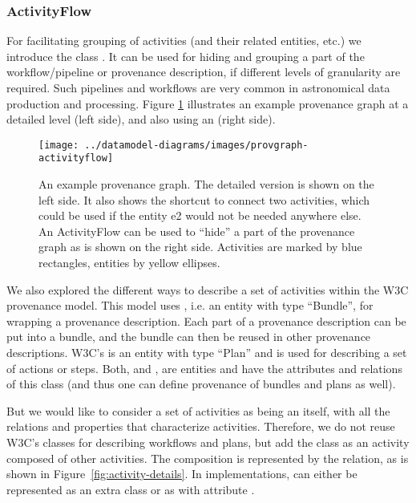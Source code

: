 \subsubsection{ActivityFlow}\label{sec:activityflow}
For facilitating grouping of activities (and their related entities, etc.) we
introduce the class . It can be used for hiding and grouping
a part of the workflow/pipeline  or provenance  description, if different levels
of granularity are required. Such pipelines and workflows are very common in
astronomical data production and processing. Figure
\ref{fig:provgraph-activityflow} illustrates an example provenance graph at a
detailed level (left side), and also using an  (right
side).


\begin{figure}[h]
\centering
\texttt{[image: ../datamodel-diagrams/images/provgraph-activityflow]}
\caption[Example provenance graph with ]{An example provenance graph. The detailed version is shown on the left side. It also shows
the shortcut  to connect two activities, which could be used if the entity e2 
would not be needed anywhere else.
An ActivityFlow can be used to ``hide'' a part of the provenance graph as is shown on the right side.
Activities are marked by blue rectangles, entities by yellow ellipses.}
\label{fig:provgraph-activityflow}
\end{figure}

We also explored the different ways to describe a set of activities within the
W3C provenance model. This model uses , i.e. an entity with type
``Bundle'',  for wrapping a provenance description. Each part of a provenance
description can be  put into a bundle, and the bundle can then be reused in
other provenance descriptions.  W3C's  is an entity with type
``Plan'' and is used for describing a  set of actions or steps. Both,
 and , are entities and  have the attributes and
relations of this class (and thus one can define provenance of bundles and plans
as well).

But we would like to consider a set of activities as being an 
itself,  with all the relations and properties that characterize activities.
Therefore, we do not reuse W3C's classes for describing workflows and plans, but
add  the class  as an activity composed of other activities. The
composition is represented by  the  relation, as is shown in
Figure~\ref{fig:activity-details}. In implementations, 
can either be represented as an extra class or as  with attribute .
%


